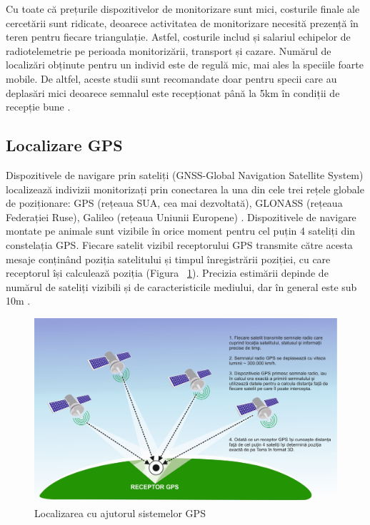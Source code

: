 \documentclass[11pt,onehalfspacing]{elife}
\begin{document}
Cu toate că prețurile dispozitivelor de monitorizare sunt mici, costurile finale ale cercetării sunt ridicate, deoarece activitatea de monitorizare necesită prezență în teren pentru fiecare triangulație. Astfel, costurile includ și salariul echipelor de radiotelemetrie pe perioada monitorizării, transport și cazare. Numărul de localizări obținute pentru un individ este de regulă mic, mai ales la speciile foarte mobile. De altfel, aceste studii sunt recomandate doar pentru specii care au deplasări mici deoarece semnalul este recepționat până la 5km în condiții de recepție bune \citep{Silvy2012}.

\subsection{Localizare GPS}
Dispozitivele de navigare prin sateliți (GNSS-Global Navigation Satellite System) localizează indivizii monitorizați prin conectarea la una din cele trei rețele globale de poziționare: GPS (rețeaua SUA, cea mai dezvoltată), GLONASS (rețeaua Federației Ruse), Galileo (rețeaua Uniunii Europene) \citep{Madry2015}. Dispozitivele de navigare montate pe animale sunt vizibile în orice moment pentru cel puțin 4 sateliți din constelația GPS. Fiecare satelit vizibil receptorului GPS transmite către acesta mesaje conținând poziția satelitului și timpul înregistrării poziției, cu care receptorul își calculează poziția (Figura ~\ref{gps}). Precizia estimării depinde de numărul de sateliți vizibili și de caracteristicile mediului, dar în general este sub 10m \citep{Silvy2012, Madry2015}.

\begin{figure}[ht]
\includegraphics[width=\textwidth]{gps.jpg}
\caption{Localizarea cu ajutorul sistemelor GPS \citep{Madry2015}} \label{gps}
\end{figure}
\end{document}
